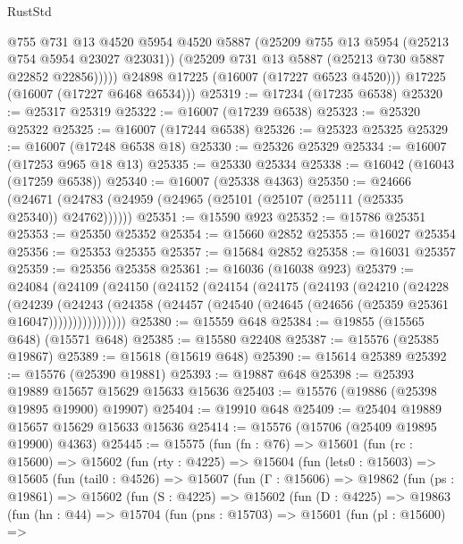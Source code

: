 \begin{lexlean}{RustStd}
\begin{coremodule}
              @755
              @731
              @13
              @4520
              @5954
              @4520
              @5887
              (@25209 @755 @13 @5954 (@25213 @754 @5954 @23027 @23031))
              (@25209 @731 @13 @5887 (@25213 @730 @5887 @22852 @22856)))))
        @24898
        @17225
        (@16007 (@17227 @6523 @4520)))
      @17225
      (@16007 (@17227 @6468 @6534)))
@25319 := @17234 (@17235 @6538)
@25320 := @25317 @25319
@25322 := @16007 (@17239 @6538)
@25323 := @25320 @25322
@25325 := @16007 (@17244 @6538)
@25326 := @25323 @25325
@25329 := @16007 (@17248 @6538 @18)
@25330 := @25326 @25329
@25334 := @16007 (@17253 @965 @18 @13)
@25335 := @25330 @25334
@25338 := @16042 (@16043 (@17259 @6538))
@25340 := @16007 (@25338 @4363)
@25350 := @24666
    (@24671 (@24783 (@24959 (@24965 (@25101 (@25107 (@25111 (@25335 @25340)) @24762))))))
@25351 := @15590 @923
@25352 := @15786 @25351
@25353 := @25350 @25352
@25354 := @15660 @2852
@25355 := @16027 @25354
@25356 := @25353 @25355
@25357 := @15684 @2852
@25358 := @16031 @25357
@25359 := @25356 @25358
@25361 := @16036 (@16038 @923)
@25379 := @24084
    (@24109
      (@24150
        (@24152
          (@24154
            (@24175
              (@24193
                (@24210
                  (@24228
                    (@24239
                      (@24243
                        (@24358
                          (@24457 (@24540 (@24645 (@24656 (@25359 @25361 @16047))))))))))))))))
@25380 := @15559 @648
@25384 := @19855 (@15565 @648) (@15571 @648)
@25385 := @15580 @22408
@25387 := @15576 (@25385 @19867)
@25389 := @15618 (@15619 @648)
@25390 := @15614 @25389
@25392 := @15576 (@25390 @19881)
@25393 := @19887 @648
@25398 := @25393 @19889 @15657 @15629 @15633 @15636
@25403 := @15576 (@19886 (@25398 @19895 @19900) @19907)
@25404 := @19910 @648
@25409 := @25404 @19889 @15657 @15629 @15633 @15636
@25414 := @15576 (@15706 (@25409 @19895 @19900) @4363)
@25445 := @15575
    (fun (fn : @76) =>
    @15601
      (fun (rc : @15600) =>
      @15602
        (fun (rty : @4225) =>
        @15604
          (fun (lets0 : @15603) =>
          @15605
            (fun (tail0 : @4526) =>
            @15607
              (fun (Γ : @15606) =>
              @19862
                (fun (ps : @19861) =>
                @15602
                  (fun (S : @4225) =>
                  @15602
                    (fun (D : @4225) =>
                    @19863
                      (fun (hn : @44) =>
                      @15704
                        (fun (pns : @15703) =>
                        @15601
                          (fun (pl : @15600) =>

\end{coremodule}
\end{lexlean}
